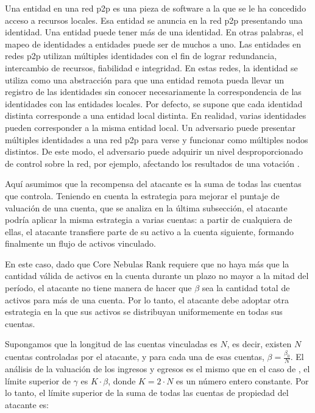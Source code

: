 Una entidad en una red p2p es una pieza de software a la que se le ha concedido acceso a recursos locales. Esa entidad se anuncia en la red p2p presentando una identidad. Una entidad puede tener más de una identidad. En otras palabras, el mapeo de identidades a entidades puede ser de muchos a uno. Las entidades en redes p2p utilizan múltiples identidades con el fin de lograr redundancia, intercambio de recursos, fiabilidad e integridad. En estas redes, la identidad se utiliza como una abstracción para que una entidad remota pueda llevar un registro de las identidades sin conocer necesariamente la correspondencia de las identidades con las entidades locales. Por defecto, se supone que cada identidad distinta corresponde a una entidad local distinta. En realidad, varias identidades pueden corresponder a la misma entidad local. Un adversario puede presentar múltiples identidades a una red p2p para verse y funcionar como múltiples nodos distintos. De este modo, el adversario puede adquirir un nivel desproporcionado de control sobre la red, por ejemplo, afectando los resultados de una votación \cite{wiki:sybil}.

Aquí asumimos que la recompensa del atacante es la suma de todas las cuentas que controla. Teniendo en cuenta la estrategia para mejorar el puntaje de valuación de una cuenta, que se analiza en la última subsección, el atacante podría aplicar la misma estrategia a varias cuentas: a partir de cualquiera de ellas, el atacante transfiere parte de su activo a la cuenta siguiente, formando finalmente un flujo de activos vinculado.

En este caso, dado que Core Nebulas Rank requiere que no haya más que la cantidad válida de activos en la cuenta durante un plazo no mayor a la mitad del período, el atacante no tiene manera de hacer que $\beta$ sea la cantidad total de activos para más de una cuenta. Por lo tanto, el atacante debe adoptar otra estrategia en la que sus activos se distribuyan uniformemente en todas sus cuentas.

Supongamos que la longitud de las cuentas vinculadas es $N$, es decir, existen $N$ cuentas controladas por el atacante, y para cada una de esas cuentas, $\beta = \frac{\beta_0}{N}$. El análisis de la valuación de los ingresos y egresos es el mismo que en el caso de , el límite superior de $\gamma$ es $K \cdot \beta$, donde $K=2\cdot N$ es un número entero constante. Por lo tanto, el límite superior de la suma de todas las cuentas de propiedad del atacante es:

